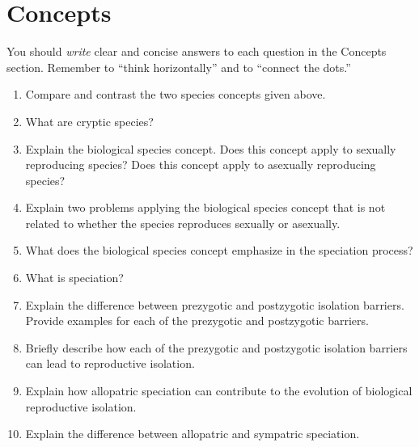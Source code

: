 \documentclass[letterpaper]{tufte-handout}
\begin{document}
\section*{Concepts}

You should \emph{write} clear and concise answers to each question in the Concepts section.  Remember to ``think horizontally'' and to ``connect the dots.'' 

\begin{enumerate}

	\item Compare and contrast the two species concepts given above.

	\item What are cryptic species?

	\item Explain the biological species concept.  Does this concept apply to sexually reproducing species?  Does this concept apply to asexually reproducing species?
	
	\item Explain two problems applying the biological species concept that is not related to whether the species reproduces sexually or asexually.

	\item What does the biological species concept emphasize in the speciation process?

	\item What is speciation?  

	\item Explain 
 the difference between prezygotic and postzygotic isolation barriers. Provide examples for each of the prezygotic and postzygotic barriers.
 
	\item Briefly describe how each of the prezygotic and postzygotic isolation barriers can lead to reproductive isolation.

	\item Explain how allopatric speciation can contribute to the evolution of biological reproductive isolation.
	
	\item Explain the difference between allopatric and sympatric speciation. %
	

\end{enumerate}
\end{document}
